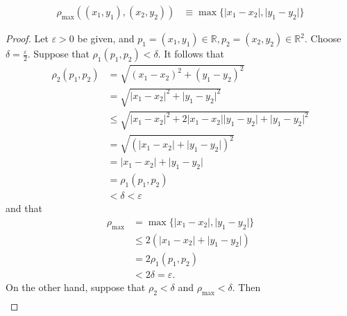 \documentclass{article}
\begin{document}
\begin{enumerate}
\begin{align}
                  \rho_{\max}((x_1, y_1), (x_2, y_2)) & \equiv \max\{\lvert x_1-x_2\rvert, \lvert y_1-y_2\rvert\}
            \end{align}
            \begin{proof}
                  Let $\varepsilon>0$ be given, and $p_1=(x_1,y_1)\in\mathbb{R},p_2=(x_2,y_2)\in \mathbb{R}^2$.
                  Choose $\delta = \frac{\varepsilon}{2}$.
                  Suppose that $\rho_1(p_1,p_2)<\delta$. It follows that
                  \begin{align*}
                        \rho_2(p_1, p_2) & = \sqrt{(x_1-x_2)^2 + (y_1-y_2)^2}                                                                      \\
                                         & = \sqrt{\lvert x_1-x_2\rvert^2 + \lvert y_1-y_2\rvert^2}                                                \\
                                         & \leq \sqrt{\lvert x_1-x_2\rvert^2 + 2\lvert x_1-x_2\rvert\lvert y_1-y_2\rvert + \lvert y_1-y_2\rvert^2} \\
                                         & = \sqrt{(\lvert x_1-x_2\rvert+\lvert y_1-y_2\rvert)^2}                                                  \\
                                         & = \lvert x_1-x_2\rvert+\lvert y_1-y_2\rvert                                                             \\
                                         & = \rho_1(p_1, p_2)                                                                                      \\
                                         & < \delta < \varepsilon
                  \end{align*}
                  and that
                  \begin{align*}
                        \rho_{\max} & = \max\{\lvert x_1-x_2\rvert,\lvert y_1-y_2\rvert\} \\
                                    & \leq 2(\lvert x_1-x_2\rvert+\lvert y_1-y_2\rvert)   \\
                                    & = 2\rho_1(p_1, p_2)                                 \\
                                    & < 2\delta = \varepsilon.
                  \end{align*}
                  On the other hand, suppose that $\rho_2<\delta$ and $\rho_{\max}<\delta$.
                  Then
                  \begin{align*}

\end{align*}
\end{proof}
\end{enumerate}
\end{document}
